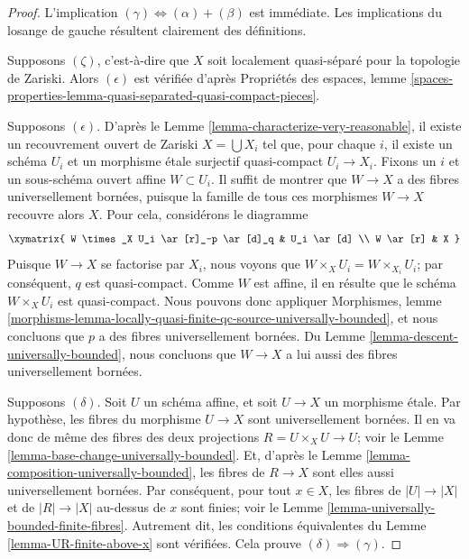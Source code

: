 \begin{proof}
L'implication $(\gamma) \Leftrightarrow (\alpha) + (\beta)$ est immédiate.
Les implications du losange de gauche résultent clairement des définitions.

\medskip\noindent
Supposons $(\zeta)$, c'est-à-dire que $X$ soit localement quasi-séparé pour
la topologie de Zariski. Alors $(\epsilon)$ est vérifiée d'après
Propriétés des espaces, lemme
\ref{spaces-properties-lemma-quasi-separated-quasi-compact-pieces}.

\medskip\noindent
Supposons $(\epsilon)$. D'après le
Lemme \ref{lemma-characterize-very-reasonable},
il existe un recouvrement ouvert de Zariski $X = \bigcup X_i$ tel que, pour
chaque $i$, il existe un schéma $U_i$ et un morphisme étale surjectif
quasi-compact $U_i \to X_i$. Fixons un $i$ et un sous-schéma ouvert affine
$W \subset U_i$. Il suffit de montrer que $W \to X$ a des fibres
universellement bornées, puisque la famille de tous ces morphismes
$W \to X$ recouvre alors $X$.
Pour cela, considérons le diagramme
$$
\xymatrix{
W \times_X U_i \ar[r]_-p \ar[d]_q & U_i \ar[d] \\
W \ar[r] & X
}
$$
Puisque $W \to X$ se factorise par $X_i$, nous voyons que
$W \times_X U_i = W \times_{X_i} U_i$; par conséquent, $q$ est quasi-compact.
Comme $W$ est affine, il en résulte que le schéma $W \times_X U_i$
est quasi-compact. Nous pouvons donc appliquer
Morphismes, lemme
\ref{morphisms-lemma-locally-quasi-finite-qc-source-universally-bounded},
et nous concluons que $p$ a des fibres universellement bornées. Du
Lemme \ref{lemma-descent-universally-bounded},
nous concluons que $W \to X$ a lui aussi des fibres universellement bornées.

\medskip\noindent
Supposons $(\delta)$. Soit $U$ un schéma affine, et soit $U \to X$ un morphisme
étale. Par hypothèse, les fibres du morphisme $U \to X$ sont universellement
bornées. Il en va donc de même des fibres des deux projections
$R = U \times_X U \to U$; voir le
Lemme \ref{lemma-base-change-universally-bounded}.
Et, d'après le
Lemme \ref{lemma-composition-universally-bounded},
les fibres de $R \to X$ sont elles aussi universellement bornées.
Par conséquent, pour tout $x \in X$, les fibres de $|U| \to |X|$ et de
$|R| \to |X|$ au-dessus de $x$ sont finies; voir le
Lemme \ref{lemma-universally-bounded-finite-fibres}.
Autrement dit, les conditions équivalentes du
Lemme \ref{lemma-UR-finite-above-x}
sont vérifiées. Cela prouve $(\delta) \Rightarrow (\gamma)$.
\end{proof}

